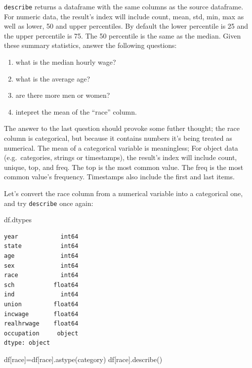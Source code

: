 \documentclass[
  letterpaper,
  DIV=11,
  numbers=noendperiod]{scrreprt}
\newenvironment{Shaded}{\begin{snugshade}}{\end{snugshade}}
\newcommand{\NormalTok}[1]{\textcolor[rgb]{0.00,0.23,0.31}{#1}}
\newcommand{\OperatorTok}[1]{\textcolor[rgb]{0.37,0.37,0.37}{#1}}
\newcommand{\StringTok}[1]{\textcolor[rgb]{0.13,0.47,0.30}{#1}}
\providecommand{\tightlist}{%
  \setlength{\itemsep}{0pt}\setlength{\parskip}{0pt}}\usepackage{longtable,booktabs,array}
\begin{document}
\texttt{describe} returns a dataframe with the same columns as the
source dataframe. For numeric data, the result's index will include
count, mean, std, min, max as well as lower, 50 and upper percentiles.
By default the lower percentile is 25 and the upper percentile is 75.
The 50 percentile is the same as the median. Given these summary
statistics, answer the following questions:

\begin{enumerate}
\def\labelenumi{\arabic{enumi})}
\tightlist
\item
  what is the median hourly wage?
\item
  what is the average age?
\item
  are there more men or women?
\item
  intepret the mean of the ``race'' column.
\end{enumerate}

The answer to the last question should provoke some futher thought; the
race column is categorical, but because it contains numbers it's being
treated as numerical. The mean of a categorical variable is meaningless;
For object data (e.g.~categories, strings or timestamps), the result's
index will include count, unique, top, and freq. The top is the most
common value. The freq is the most common value's frequency. Timestamps
also include the first and last items.

Let's convert the race column from a numerical variable into a
categorical one, and try \texttt{describe} once again:

\begin{Shaded}
\begin{Highlighting}[]
\NormalTok{df.dtypes}
\end{Highlighting}
\end{Shaded}

\begin{verbatim}
year            int64
state           int64
age             int64
sex             int64
race            int64
sch           float64
ind             int64
union         float64
incwage       float64
realhrwage    float64
occupation     object
dtype: object
\end{verbatim}

\begin{Shaded}
\begin{Highlighting}[]
\NormalTok{df[}\StringTok{\textquotesingle{}race\textquotesingle{}}\NormalTok{]}\OperatorTok{=}\NormalTok{df[}\StringTok{\textquotesingle{}race\textquotesingle{}}\NormalTok{].astype(}\StringTok{\textquotesingle{}category\textquotesingle{}}\NormalTok{)}
\NormalTok{df[}\StringTok{\textquotesingle{}race\textquotesingle{}}\NormalTok{].describe()}
\end{Highlighting}
\end{Shaded}
\end{document}
